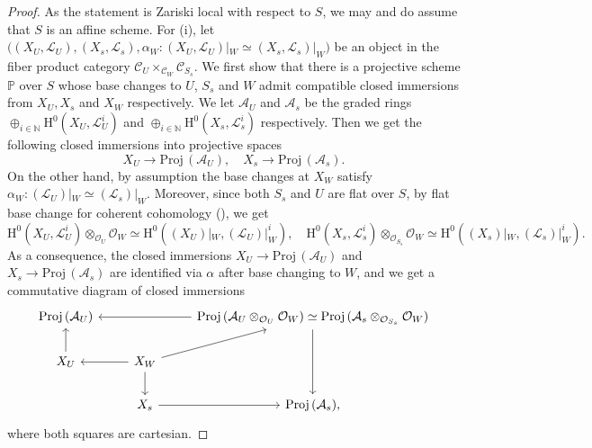 \documentclass[11pt, letterpaper]{amsart}
\theoremstyle{plain}
\theoremstyle{definition}
\newcommand{\sC}{\mathcal{C}}
\newcommand{\<}{\langle}
\renewcommand{\>}{\rangle}
\newcommand{\Proj}{\mathrm{Proj\,}}
\newcommand{\sL}{\mathcal{L}}
\newcommand{\sO}{\mathcal{O}}
\newcommand{\sA}{\mathcal{A}}
\renewcommand{\H}{\mathrm{H}}
\begin{document}
\begin{proof}
	As the statement is Zariski local with respect to $S$, we may and do assume that $S$ is an affine scheme.
	For (i), let $\bigl( (X_U, \sL_U), (X_s,\sL_s), \alpha_W: (X_U,\sL_U)|_W \simeq (X_s, \sL_s)|_W)$ be an object in the fiber product category $\sC_U \times_{\sC_W} \sC_{S_s}$. 
	We first show that there is a projective scheme $\mathbb{P}$ over $S$ whose base changes to $U$, $S_s$ and $W$ admit compatible closed immersions from $X_U, X_s$ and $X_W$ respectively. 
	We let $\sA_U$ and $\sA_s$ be the graded rings $\oplus_{i\in \mathbb{N}} \H^0(X_U, \sL_U^i)$ and $\oplus_{i\in \mathbb{N}} \H^0(X_s, \sL_s^i)$ respectively.
	Then we get the following closed immersions into projective spaces
	\[
	X_U \to \Proj( \sA_U), \quad X_s \to \Proj( \sA_s).
	\]
	On the other hand, by assumption the base changes at $X_W$ satisfy $\alpha_W: (\sL_U)|_W \simeq (\sL_s)|_W$.
	Moreover, since both $S_s$ and $U$ are flat over $S$, by flat base change for coherent cohomology (\cite[\href{https://stacks.math.columbia.edu/tag/02KH}{Tag 02KH}]{stacks-project}), we get
	\[
	\H^0(X_U, \sL_U^i) \otimes_{\sO_U} \sO_{W} \simeq \H^0((X_U)|_W, (\sL_U)|_W^i), \quad \H^0(X_s, \sL_s^i) \otimes_{\sO_{S_s}} \sO_{W} \simeq \H^0((X_s)|_W, (\sL_s)|_W^i).
	\]
	As a consequence, the closed immersions $X_U \to \Proj( \sA_U)$ and  $X_s \to \Proj( \sA_s)$ are identified via $\alpha$ after base changing to $W$, and we get a commutative diagram of closed immersions
	\[
	\begin{tikzcd}
		\Proj(\sA_U) && \Proj(\sA_U\otimes_{\sO_U} \sO_W) \simeq \Proj(\sA_s\otimes_{\sO_{S_s}} \sO_W) \ar[ll] \ar[dd]\\
		X_U \ar[u] & X_W \ar[l] \ar[d] \ar[ru] &\\
		& X_s \ar[r] & \Proj(\sA_s),
	\end{tikzcd}
	\]
	where both squares are cartesian.
	

\end{proof}
\end{document}
